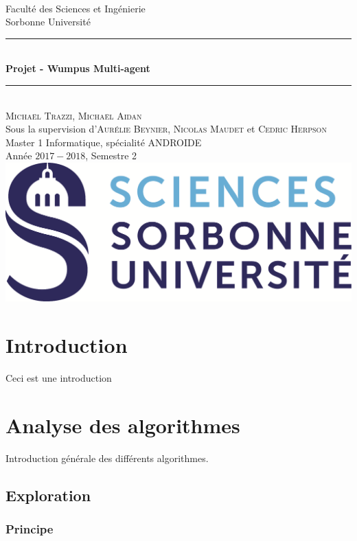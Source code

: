 \documentclass[a4paper, 10pt]{article}
\newcommand{\HRule}{\rule{\linewidth}{0.5mm}}
\begin{document}
\begin{titlepage}
\begin{center}
~\\[1cm]
\Large Faculté des Sciences et Ingénierie\\Sorbonne Université\\[3.5cm]
\HRule 
\\[0.4cm]{\huge \bfseries Projet - Wumpus Multi-agent\\[0.4cm]}
\HRule \\[1cm] 
\Large \textsc{Michaël Trazzi, Michaël Aidan} \\[0.1cm]
\normalsize Sous la supervision d'\textsc{Aurélie Beynier, Nicolas Maudet} et \textsc{Cedric Herpson}\\[2cm]
\Large Master 1 Informatique, spécialité ANDROIDE\\Année $2017-2018$, Semestre 2 \\[4cm]
\includegraphics[scale=0.3]{logo.png}
\end{center}
\end{titlepage}

\tableofcontents

\newpage
\section{Introduction}

Ceci est une introduction

\section{Analyse des algorithmes}

Introduction générale des différents algorithmes.

\subsection{Exploration}

\subsubsection{Principe}
\end{document}
